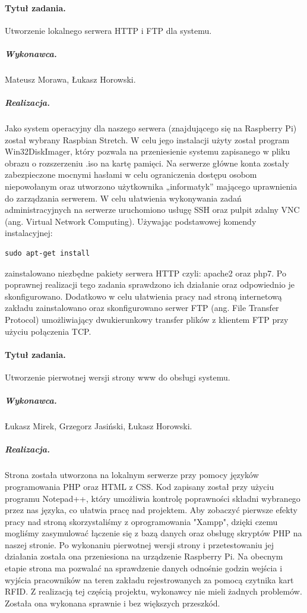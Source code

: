 \documentclass[a4paper]{article}
\begin{document}
\paragraph{Tytuł zadania.} Utworzenie lokalnego serwera HTTP i FTP dla systemu.
\subparagraph{Wykonawca.} Mateusz Morawa, Łukasz Horowski.
\subparagraph{Realizacja.} Jako system operacyjny dla naszego serwera (znajdującego się na Raspberry Pi) został wybrany Raspbian Stretch. W celu jego instalacji użyty został program Win32DiskImager, który pozwala na przeniesienie systemu zapisanego w pliku obrazu o rozszerzeniu .iso na kartę pamięci. Na serwerze główne konta zostały zabezpieczone mocnymi hasłami w celu ograniczenia dostępu osobom niepowołanym oraz utworzono użytkownika „informatyk” mającego uprawnienia do zarządzania serwerem. W celu ułatwienia wykonywania zadań administracyjnych na serwerze uruchomiono usługę SSH oraz pulpit zdalny VNC (ang. Virtual Network Computing). Używając podstawowej komendy instalacyjnej:
\begin{verbatim}
sudo apt-get install
\end{verbatim}
zainstalowano niezbędne pakiety serwera HTTP czyli: apache2 oraz php7. Po poprawnej realizacji tego zadania sprawdzono ich działanie oraz odpowiednio je skonfigurowano. Dodatkowo w celu ułatwienia pracy nad stroną internetową zakładu zainstalowano oraz skonfigurowano serwer FTP (ang. File Transfer Protocol) umożliwiający dwukierunkowy transfer plików z klientem FTP przy użyciu połączenia TCP.
 
\paragraph{Tytuł zadania.} Utworzenie pierwotnej wersji strony www do obsługi systemu.
\subparagraph{Wykonawca.} Łukasz Mirek, Grzegorz Jasiński, Łukasz Horowski.
\subparagraph{Realizacja.} Strona została utworzona na lokalnym serwerze przy pomocy języków programowania PHP oraz HTML z CSS. Kod zapisany został przy użyciu programu Notepad++, który umożliwia kontrolę poprawności składni wybranego przez nas języka, co ułatwia pracę nad projektem. Aby zobaczyć pierwsze efekty pracy nad stroną skorzystaliśmy z oprogramowania "Xampp", dzięki czemu mogliśmy zasymulować łączenie się z bazą danych oraz obsługę skryptów PHP na naszej stronie. Po wykonaniu pierwotnej wersji strony i przetestowaniu jej działania została ona przeniesiona na urządzenie Raspberry Pi. Na obecnym etapie strona ma pozwalać na sprawdzenie danych odnośnie godzin wejścia i wyjścia pracowników na teren zakładu rejestrowanych za pomocą czytnika kart RFID. Z realizacją tej częścią projektu, wykonawcy nie mieli żadnych problemów. Została ona wykonana sprawnie i bez większych przeszkód.  
\end{document}
